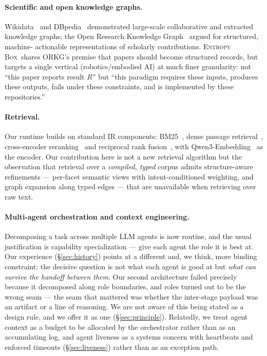 \documentclass[10pt,a4paper]{article}
\newcommand{\eb}{\textsc{Entropy Box}\xspace}
\begin{document}
\paragraph{Scientific and open knowledge graphs.}
Wikidata~\cite{vrandecic2014wikidata} and DBpedia~\cite{auer2007dbpedia}
demonstrated large-scale collaborative and extracted knowledge graphs; the Open
Research Knowledge Graph~\cite{jaradeh2019orkg} argued for structured, machine-
actionable representations of scholarly contributions. \eb\ shares ORKG's premise
that papers should become structured records, but targets a single vertical
(robotics/embodied AI) at much finer granularity: not ``this paper reports result
$R$'' but ``this paradigm requires these inputs, produces these outputs, fails
under these constraints, and is implemented by these repositories.''

\paragraph{Retrieval.}
Our runtime builds on standard IR components: BM25~\cite{robertson2009bm25},
dense passage retrieval~\cite{karpukhin2020dpr}, cross-encoder
reranking~\cite{nogueira2019passage} and reciprocal rank
fusion~\cite{cormack2009rrf}, with Qwen3-Embedding~\cite{qwen3embedding} as the
encoder. Our contribution here is not a new retrieval algorithm but the
observation that retrieval over a \emph{compiled, typed} corpus admits
structure-aware refinements --- per-facet semantic views with intent-conditioned
weighting, and graph expansion along typed edges --- that are unavailable when
retrieving over raw text.

\paragraph{Multi-agent orchestration and context engineering.}
Decomposing a task across multiple LLM agents is now routine, and the usual
justification is capability specialization --- give each agent the role it is
best at. Our experience (\S\ref{sec:history}) points at a different and, we
think, more binding constraint: the decisive question is not what each agent is
good at but \emph{what can survive the handoff between them}. Our second
architecture failed precisely because it decomposed along role boundaries, and
roles turned out to be the wrong seam --- the seam that mattered was whether the
inter-stage payload was an artifact or a line of reasoning. We are not aware of
this being stated as a design rule, and we offer it as one
(\S\ref{sec:principle}). Relatedly, we treat agent context as a budget to be
allocated by the orchestrator rather than as an accumulating log, and agent
liveness as a systems concern with heartbeats and enforced timeouts
(\S\ref{sec:liveness}) rather than as an exception path.
\end{document}
